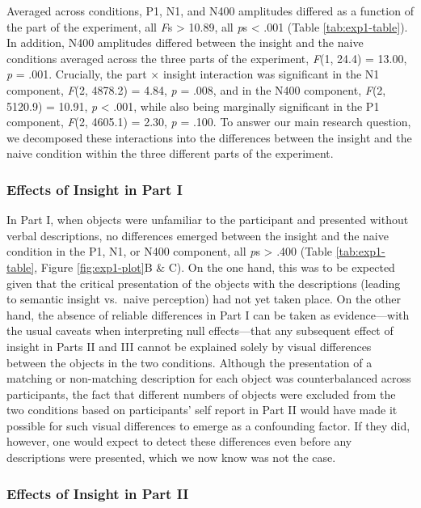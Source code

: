 \documentclass[
  english,
  man,11pt,floatsintext]{apa7}
\begin{document}
Averaged across conditions, P1, N1, and N400 amplitudes differed as a function of the part of the experiment, all \emph{F}s \textgreater{} 10.89, all \emph{p}s \textless{} .001 (Table \ref{tab:exp1-table}). In addition, N400 amplitudes differed between the insight and the naive conditions averaged across the three parts of the experiment, \emph{F}(1, 24.4) = 13.00, \emph{p} = .001. Crucially, the part × insight interaction was significant in the N1 component, \emph{F}(2, 4878.2) = 4.84, \emph{p} = .008, and in the N400 component, \emph{F}(2, 5120.9) = 10.91, \emph{p} \textless{} .001, while also being marginally significant in the P1 component, \emph{F}(2, 4605.1) = 2.30, \emph{p} = .100. To answer our main research question, we decomposed these interactions into the differences between the insight and the naive condition within the three different parts of the experiment.

\hypertarget{effects-of-insight-in-part-i}{%
\subsubsection{Effects of Insight in Part I}\label{effects-of-insight-in-part-i}}

In Part I, when objects were unfamiliar to the participant and presented without verbal descriptions, no differences emerged between the insight and the naive condition in the P1, N1, or N400 component, all \emph{p}s \textgreater{} .400 (Table \ref{tab:exp1-table}, Figure \ref{fig:exp1-plot}B \& C). On the one hand, this was to be expected given that the critical presentation of the objects with the descriptions (leading to semantic insight vs.~naive perception) had not yet taken place. On the other hand, the absence of reliable differences in Part I can be taken as evidence---with the usual caveats when interpreting null effects---that any subsequent effect of insight in Parts II and III cannot be explained solely by visual differences between the objects in the two conditions. Although the presentation of a matching or non-matching description for each object was counterbalanced across participants, the fact that different numbers of objects were excluded from the two conditions based on participants' self report in Part II would have made it possible for such visual differences to emerge as a confounding factor. If they did, however, one would expect to detect these differences even before any descriptions were presented, which we now know was not the case.

\hypertarget{effects-of-insight-in-part-ii}{%
\subsubsection{Effects of Insight in Part II}\label{effects-of-insight-in-part-ii}}
\end{document}
